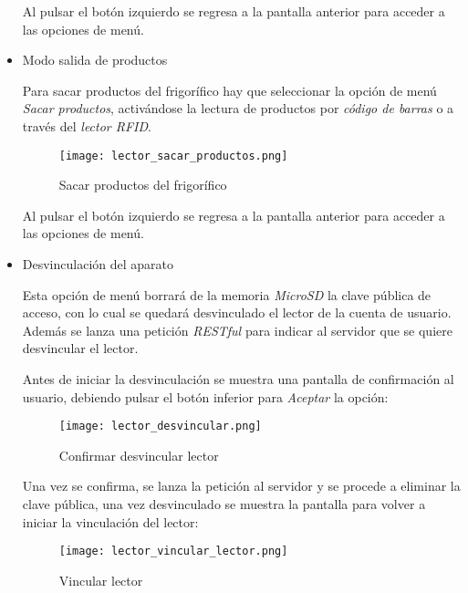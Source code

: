 \begin{itemize}
        Al pulsar el botón izquierdo se regresa a la pantalla anterior para acceder a las opciones de menú.

    \item Modo salida de productos

        Para sacar productos del frigorífico hay que seleccionar la opción de menú  \emph{Sacar productos}, activándose la lectura de productos por \emph{código de barras} o a través del \emph{lector RFID}.

        \begin{figure}[h!]
            \centering
            \texttt{[image: lector\_sacar\_productos.png]}
            \caption{Sacar productos del frigorífico}\label{fig:lector_sacar_productos}
        \end{figure}

        Al pulsar el botón izquierdo se regresa a la pantalla anterior para acceder a las opciones de menú.

    \item Desvinculación del aparato

        Esta opción de menú borrará de la memoria \emph{MicroSD} la clave pública de acceso, con lo cual se quedará desvinculado el lector de la cuenta de usuario. Además se lanza una petición \emph{RESTful} para indicar al servidor que se quiere desvincular el lector.

        Antes de iniciar la desvinculación se muestra una pantalla de confirmación al usuario, debiendo pulsar el botón inferior para \emph{Aceptar} la opción:

        \begin{figure}[h!]
            \centering
            \texttt{[image: lector\_desvincular.png]}
            \caption{Confirmar desvincular lector}\label{fig:lector_desvincular}
        \end{figure}

        Una vez se confirma, se lanza la petición al servidor y se procede a eliminar la clave pública, una vez desvinculado se muestra la pantalla para volver a iniciar la vinculación del lector:

        \begin{figure}[h!]
            \centering
            \texttt{[image: lector\_vincular\_lector.png]}
            \caption{Vincular lector}\label{fig:lector_vincular_lector}
        \end{figure}

\end{itemize}